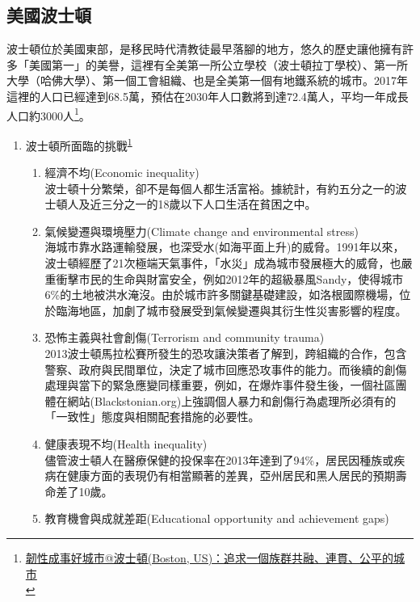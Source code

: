 \documentclass[a4paper,12pt]{article}
\begin{document}
\subsection{美國波士頓}
\label{sec:orga29ff77}
波士頓位於美國東部，是移民時代清教徒最早落腳的地方，悠久的歷史讓他擁有許多「美國第一」的美譽，這裡有全美第一所公立學校（波士頓拉丁學校）、第一所大學（哈佛大學）、第一個工會組織、也是全美第一個有地鐵系統的城市。2017年這裡的人口已經達到68.5萬，預估在2030年人口數將到達72.4萬人，平均一年成長人口約3000人\footnote{\href{https://eyesonplace.net/2018/12/28/10053/}{韌性成事好城市@波士頓(Boston, US)：追求一個族群共融、連貫、公平的城市}\\\label{org1d9655c}}。\\

\begin{enumerate}
\item 波士頓所面臨的挑戰\textsuperscript{\ref{org1d9655c}}
\label{sec:orgebcbbc5}
\begin{enumerate}
\item 經濟不均(Economic inequality)\\
波士頓十分繁榮，卻不是每個人都生活富裕。據統計，有約五分之一的波士頓人及近三分之一的18歲以下人口生活在貧困之中。\\
\item 氣候變遷與環境壓力(Climate change and environmental stress)\\
海城市靠水路運輸發展，也深受水(如海平面上升)的威脅。1991年以來，波士頓經歷了21次極端天氣事件，「水災」成為城市發展極大的威脅，也嚴重衝擊市民的生命與財富安全，例如2012年的超級暴風Sandy，使得城市6\%的土地被洪水淹沒。由於城市許多關鍵基礎建設，如洛根國際機場，位於臨海地區，加劇了城市發展受到氣候變遷與其衍生性災害影響的程度。\\
\item 恐怖主義與社會創傷(Terrorism and community trauma)\\
2013波士頓馬拉松賽所發生的恐攻讓決策者了解到，跨組織的合作，包含警察、政府與民間單位，決定了城市回應恐攻事件的能力。而後續的創傷處理與當下的緊急應變同樣重要，例如，在爆炸事件發生後，一個社區團體在網站(Blackstonian.org)上強調個人暴力和創傷行為處理所必須有的「一致性」態度與相關配套措施的必要性。\\
\item 健康表現不均(Health inequality)\\
儘管波士頓人在醫療保健的投保率在2013年達到了94\%，居民因種族或疾病在健康方面的表現仍有相當顯著的差異，亞州居民和黑人居民的預期壽命差了10歲。\\
\item 教育機會與成就差距(Educational opportunity and achievement gaps)\\

\end{enumerate}
\end{enumerate}
\end{document}
